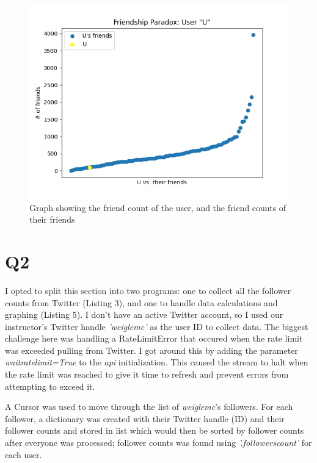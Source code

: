 \documentclass[12pt]{article}
\begin{document}
\begin{figure}
    \centering
    \includegraphics{Q1_Graph.png}
    \caption{Graph showing the friend count of the user, and the friend counts of their friends}
    \label{fig:my_label}
\end{figure}

\section*{Q2}

I opted to split this section into two programs: one to collect all the follower counts from Twitter (Listing 3), and one to handle data calculations and graphing (Listing 5). I don't have an active Twitter account, so I used our instructor's Twitter handle \emph{'weiglemc'} as the user ID to collect data. The biggest challenge here was handling a RateLimitError that occured when the rate limit was exceeded pulling from Twitter. I got around this by adding the parameter \emph{wait\textunderscore rate\textunderscore limit=True} to the \emph{api} initialization. This caused the stream to halt when the rate limit was reached to give it time to refresh and prevent errors from attempting to exceed it. 

\par A Cursor was used to move through the list of \emph{weiglemc}'s followers. For each follower, a dictionary was created with their Twitter handle (ID) and their follower counts and stored in list which would then be sorted by follower counts after everyone was processed; follower counts was found using \emph{'.followers\textunderscore count'} for each user.
\end{document}
